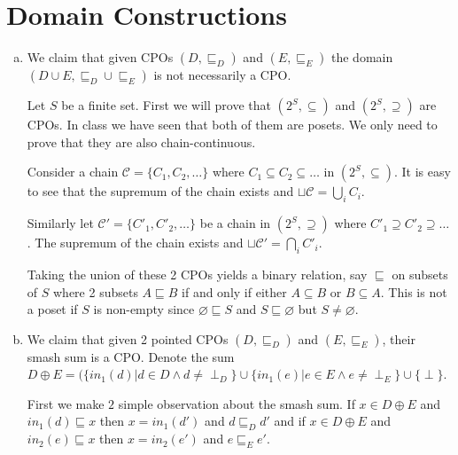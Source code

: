 \section{Domain Constructions}

\begin{enumerate}[(a)]
\item We claim that given CPOs $(D, \sqsubseteq_D)$ and $(E, \sqsubseteq_E)$ the domain $(D \cup E, \sqsubseteq_D \cup \sqsubseteq_E)$ is not necessarily a CPO.

Let $S$ be a finite set. First we will prove that $(2^S, \subseteq)$ and $(2^S, \supseteq)$ are CPOs. In class we have seen that both of them are posets. We only need to prove that they are also chain-continuous.

Consider a chain $\mathcal C = \{C_1, C_2, \ldots\}$ where $C_1 \subseteq C_2 \subseteq \ldots$ in $(2^S, \subseteq)$. It is easy to see that the supremum of the chain exists and $\sqcup \mathcal C = \bigcup \limits_i C_i$.

Similarly let $\mathcal C' = \{C'_1, C'_2, \ldots\}$ be a chain in $(2^S, \supseteq)$ where $C'_1 \supseteq C'_2 \supseteq \ldots$. The supremum of the chain exists and $\sqcup \mathcal C' = \bigcap \limits_i C'_i$.


Taking the union of these 2 CPOs yields a binary relation, say $\sqsubseteq$ on subsets of $S$ where 2 subsets $A \sqsubseteq B$ if and only if either $A \subseteq B$ or $B \subseteq A$. This is not a poset if $S$ is non-empty since $\varnothing \sqsubseteq S$ and $S \sqsubseteq \varnothing$ but $S \neq \varnothing$.
\item We claim that given 2 pointed CPOs $(D, \sqsubseteq_D)$ and $(E, \sqsubseteq_E)$, their smash sum is a CPO. Denote the sum $ D \oplus E = (\{in_1(d) | d \in D \wedge d \neq \perp_D\} \cup \{in_1(e) | e \in E \wedge e \neq \perp_E\} \cup \{\perp\}$.

First we make $2$ simple observation about the smash sum. If $x \in D \oplus E$ and $in_1(d) \sqsubseteq x$ then $x = in_1(d')$ and $d \sqsubseteq_D d'$ and if $x \in D \oplus E$ and $in_2(e) \sqsubseteq x$ then $x = in_2(e')$ and $e \sqsubseteq_E e'$.


\end{enumerate}
